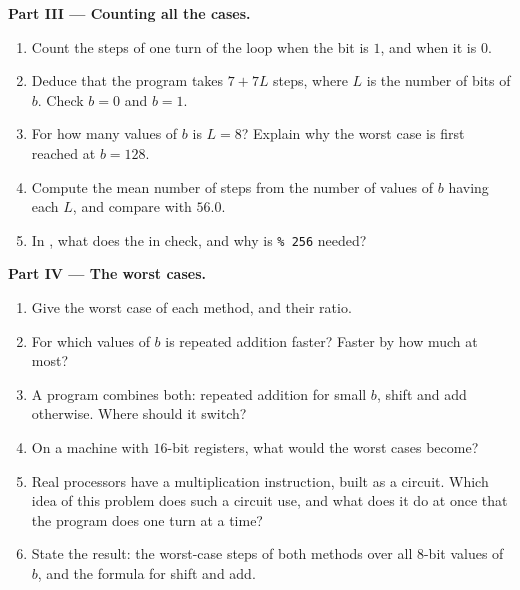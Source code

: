 \begin{problem}
\medskip\noindent\textbf{Part III --- Counting all the cases.}
\begin{enumerate}[resume]
  \item Count the steps of one turn of the loop when the bit is $1$, and when it is $0$.
  \item Deduce that the program takes $7 + 7L$ steps, where $L$ is the number of bits of $b$. Check $b = 0$ and
    $b = 1$.
  \item For how many values of $b$ is $L = 8$? Explain why the worst case is first reached at $b = 128$.
  \item Compute the mean number of steps from the number of values of $b$ having each $L$, and compare with $56.0$.
  \item In , what does the  in  check, and why is \texttt{\% 256} needed?
\end{enumerate}

\medskip\noindent\textbf{Part IV --- The worst cases.}
\begin{enumerate}[resume]
  \item Give the worst case of each method, and their ratio.
  \item For which values of $b$ is repeated addition faster? Faster by how much at most?
  \item A program combines both: repeated addition for small $b$, shift and add otherwise. Where should it switch?
  \item On a machine with $16$-bit registers, what would the worst cases become?
  \item Real processors have a multiplication instruction, built as a circuit. Which idea of this problem does such a
    circuit use, and what does it do at once that the program does one turn at a time?
  \item State the result: the worst-case steps of both methods over all $8$-bit values of $b$, and the formula for
    shift and add.
\end{enumerate}
\end{problem}
